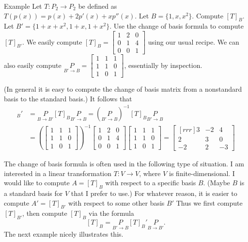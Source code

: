 \begin{frame}{Example}
 Let $T\colon P_2\rightarrow P_2$ be defined as $T(p(x))=p(x)+2p'(x)+xp''(x)$. 
 \bb
 \ii Let $B=\{1, x, x^2\}$. Compute $[T]_B$. 
 \ii Let $B'=\{1+x+x^2, 1+x, 1+x^2\}$. Use the change of basis formula to compute $[T]_{B'}$. 
 \ee
 \pause
 We easily compute $[T]_B=\begin{bmatrix}
 1&2&0\\
 0&1&4\\
 0&0&1
 \end{bmatrix}
 $
 using our usual recipe. 
 \bpause We can also easily compute $\underset{B'\rightarrow B}{P}=\begin{bmatrix}
 1&1&1\\
 1&1&0\\
 1&0&1
 \end{bmatrix}$, essentially by inspection. 
 
 (In general it is easy to compute the change of basis matrix from a nonstandard basis to the standard basis.) 
 \bpause
 It follows that 
 \begin{align*}
 [T]_B'&=\underset{B\rightarrow B'}{P}[T]_B\underset{B'\rightarrow B}{P}=\left( \underset{B'\rightarrow B}{P}\right)^{-1}[T]_B\underset{B'\rightarrow B}{P}\\
 &=\left( \begin{bmatrix}
 1&1&1\\
 1&1&0\\
 1&0&1
 \end{bmatrix}\right)^{-1}\begin{bmatrix}
 1&2&0\\
 0&1&4\\
 0&0&1
 \end{bmatrix}
\begin{bmatrix}
 1&1&1\\
 1&1&0\\
 1&0&1
 \end{bmatrix}=
 \begin{bmatrix}[rrr]
 3&-2&4\\
 2&3&0\\
 -2&2&-3
 \end{bmatrix}
 \end{align*}
\end{frame}
\begin{frame}
 The change of basis formula is often used in the following type of situation. 
\bb
\ii I am interested in a linear transformation $T\colon V\rightarrow V$, where $V$ is finite-dimensional. 
\pause \ii I would like to compute $A=[T]_B$ with respect to a specific basis $B$. (Maybe $B$ is a standard basis for $V$ that I prefer to use.) 
\pause \ii For whatever reason, it is easier to compute $A'=[T]_{B'}$ with respect to some other basis $B'$
\pause \ii Thus we first compute $[T]_{B'}$, then compute $[T]_B$ via the formula 
\[
[T]_B=\underset{B'\rightarrow B}{P}[T]_B'\underset{B\rightarrow B'}{P}.
\]
\ee
The next example nicely illustrates this. 
\end{frame}
